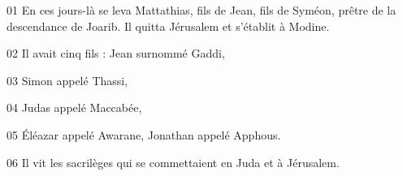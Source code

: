 01 En ces jours-là se leva Mattathias, fils de Jean, fils de Syméon, prêtre de la descendance de Joarib. Il quitta Jérusalem et s’établit à Modine.

02 Il avait cinq fils : Jean surnommé Gaddi,

03 Simon appelé Thassi,

04 Judas appelé Maccabée,

05 Éléazar appelé Awarane, Jonathan appelé Apphous.

06 Il vit les sacrilèges qui se commettaient en Juda et à Jérusalem.
